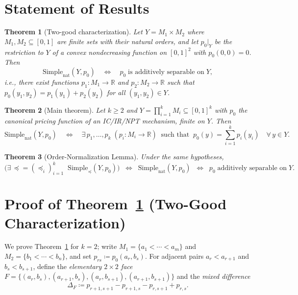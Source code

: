 \documentclass[11pt]{article}
\newtheorem{theorem}{Theorem}[section]
\newcommand{\R}{\mathbb{R}}
\newcommand{\Simplenat}{\mathrm{Simple}_{\mathrm{nat}}}
\newcommand{\Simpleord}{\mathrm{Simple}_{\preceq}}
\begin{document}
\section{Statement of Results}\label{sec:results}

\begin{theorem}[Two-good characterization]\label{thm:k2}
Let $Y = M_1 \times M_2$ where $M_1, M_2 \subseteq [0,1]$ are finite sets
with their natural orders, and let $p_0|_Y$ be the restriction to $Y$ of a
convex nondecreasing function on $[0,1]^2$ with $p_0(0,0) = 0$.  Then
\[
  \Simplenat(Y, p_0) \quad\Longleftrightarrow\quad
  p_0 \;\text{is additively separable on}\; Y,
\]
i.e., there exist functions $p_1\colon M_1 \to \R$ and $p_2\colon M_2 \to \R$
such that $p_0(y_1,y_2) = p_1(y_1) + p_2(y_2)$ for all $(y_1,y_2) \in Y$.
\end{theorem}

\begin{theorem}[Main theorem]\label{thm:main}
Let $k \geq 2$ and $Y = \prod_{i=1}^k M_i \subseteq [0,1]^k$ with $p_0$ the
canonical pricing function of an IC/IR/NPT mechanism, finite on $Y$.  Then
\[
  \Simplenat(Y, p_0) \quad\Longleftrightarrow\quad
  \exists\, p_1,\dots,p_k \;(p_i\colon M_i \to \R) \;\;\text{such that}\;\;
  p_0(y) = \sum_{i=1}^k p_i(y_i) \quad \forall\, y \in Y.
\]
\end{theorem}

\begin{theorem}[Order-Normalization Lemma]\label{thm:order-norm}
Under the same hypotheses,
\[
  \bigl(\exists\, \preceq = (\preceq_i)_{i=1}^k\;\; \Simpleord(Y, p_0)\bigr)
  \;\;\Longleftrightarrow\;\;
  \Simplenat(Y, p_0)
  \;\;\Longleftrightarrow\;\;
  p_0 \;\text{additively separable on}\; Y.
\]
\end{theorem}

\section{Proof of Theorem~\ref{thm:k2} (Two-Good Characterization)}\label{sec:k2proof}

We prove Theorem~\ref{thm:k2} for $k=2$; write $M_1 = \{a_1 < \cdots < a_m\}$
and $M_2 = \{b_1 < \cdots < b_n\}$, and set $p_{rs} \coloneqq p_0(a_r, b_s)$.
For adjacent pairs $a_r < a_{r+1}$ and $b_s < b_{s+1}$, define the
\emph{elementary $2\times 2$ face} $F = \{(a_r,b_s),(a_{r+1},b_s),(a_r,b_{s+1}),(a_{r+1},b_{s+1})\}$
and the \emph{mixed difference}
\[
  \Delta_F \coloneqq p_{r+1,s+1} - p_{r+1,s} - p_{r,s+1} + p_{r,s}.
\]
\end{document}
